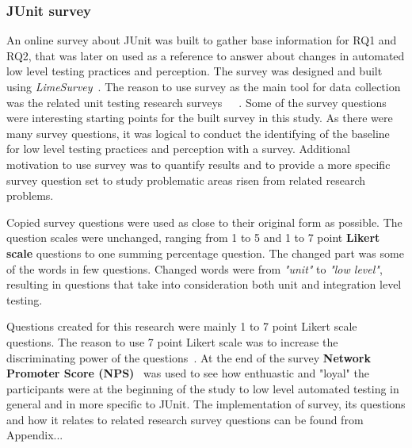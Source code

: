     \subsubsection{JUnit survey}
    An online survey about JUnit was built to gather base information for RQ1 and RQ2, that was
    later on used as a reference to answer about changes in automated low level testing practices and perception.
    The survey was designed and built using \textit{LimeSurvey}~\cite{limesurvey}. The reason to use survey as the main tool for data collection
    was the related unit testing research surveys~\cite{williams2009effectiveness}~\cite{daka2014survey}~\cite{li2016automatically}.
    Some of the survey questions were interesting starting points
    for the built survey in this study. As there were many survey questions, it was logical to conduct the identifying
    of the baseline for low level testing practices and perception with a survey. Additional motivation to use
    survey was to quantify results and to provide a more specific survey question set to study problematic
    areas risen from related research problems.

    Copied survey questions were used as close to their original form as possible.
    The question scales were unchanged, ranging from 1 to 5 and 1 to 7 point \textbf{Likert scale} questions
    to one summing percentage question. The changed part was some of the words in few questions.
    Changed words were from \textit{"unit"} to \textit{"low level"},
    resulting in questions that take into consideration both unit and integration level testing.

    Questions created for this research were mainly 1 to 7 point Likert scale questions.
    The reason to use 7 point Likert scale was to increase the discriminating power of the questions~\cite{cummins2000we}.
    At the end of the survey \textbf{Network Promoter Score (NPS)}~\cite{reichheld2003one} was used to see how enthuastic and "loyal" the participants
    were at the beginning of the study to low level automated testing in general and in more specific to JUnit.
    The implementation of survey, its questions and how it relates to related research survey questions can be found from Appendix...

